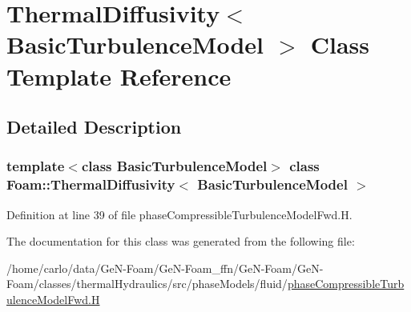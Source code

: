\hypertarget{classFoam_1_1ThermalDiffusivity}{}\section{Thermal\+Diffusivity$<$ Basic\+Turbulence\+Model $>$ Class Template Reference}
\label{classFoam_1_1ThermalDiffusivity}


\subsection{Detailed Description}
\subsubsection*{template$<$class Basic\+Turbulence\+Model$>$\newline
class Foam\+::\+Thermal\+Diffusivity$<$ Basic\+Turbulence\+Model $>$}



Definition at line 39 of file phase\+Compressible\+Turbulence\+Model\+Fwd.\+H.



The documentation for this class was generated from the following file\+:\begin{DoxyCompactItemize}
\item 
/home/carlo/data/\+Ge\+N-\/\+Foam/\+Ge\+N-\/\+Foam\+\_\+ffn/\+Ge\+N-\/\+Foam/\+Ge\+N-\/\+Foam/classes/thermal\+Hydraulics/src/phase\+Models/fluid/\hyperlink{phaseCompressibleTurbulenceModelFwd_8H}{phase\+Compressible\+Turbulence\+Model\+Fwd.\+H}\end{DoxyCompactItemize}
